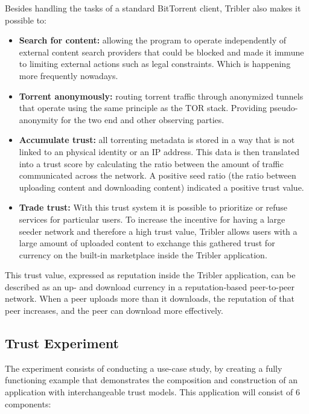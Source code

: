 Besides handling the tasks of a standard BitTorrent client, Tribler also makes it possible to:

\begin{itemize}
	\item \textbf{Search for content: } allowing the program to operate independently of external content search providers that could be blocked and made it immune to limiting external actions such as legal constraints. Which is happening more frequently nowadays.
	\item \textbf{Torrent anonymously: } routing torrent traffic through anonymized tunnels that operate using the same principle as the TOR stack. Providing pseudo-anonymity for the two end and other observing parties.
	\item \textbf{Accumulate trust: } all torrenting metadata is stored in a way that is not linked to an physical identity or an IP address. This data is then translated into a trust score by calculating the ratio between the amount of traffic communicated across the network. A positive seed ratio (the ratio between uploading content and downloading content) indicated a positive trust value.
	\item \textbf{Trade trust: } With this trust system it is possible to prioritize or refuse services for particular users. To increase the incentive for having a large seeder network and therefore a high trust value, Tribler allows users with a large amount of uploaded content to exchange this gathered trust for currency on the built-in marketplace inside the Tribler application.
\end{itemize}

This trust value, expressed as reputation inside the Tribler application, can be described as an up- and download currency in a reputation-based peer-to-peer network. When a peer uploads more than it downloads, the reputation of that peer increases, and the peer can download more effectively.

\subsection{Trust Experiment}

The experiment consists of conducting a use-case study, by creating a fully functioning example that demonstrates the composition and construction of an application with interchangeable trust models. This application will consist of 6 components:

\vspace{0.5cm}


